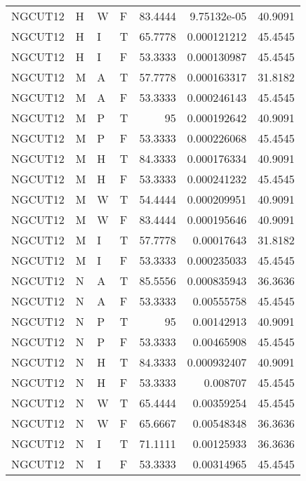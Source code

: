 \begin{table}[!htb]
{\begin{tabular}{llllrrr}
            NGCUT12  & H     & W     & F          & 83.4444    & 9.75132e-05 & 40.9091  \\
            NGCUT12  & H     & I     & T          & 65.7778    & 0.000121212 & 45.4545  \\
            NGCUT12  & H     & I     & F          & 53.3333    & 0.000130987 & 45.4545  \\
            NGCUT12  & M     & A     & T          & 57.7778    & 0.000163317 & 31.8182  \\
            NGCUT12  & M     & A     & F          & 53.3333    & 0.000246143 & 45.4545  \\
            NGCUT12  & M     & P     & T          & 95         & 0.000192642 & 40.9091  \\
            NGCUT12  & M     & P     & F          & 53.3333    & 0.000226068 & 45.4545  \\
            NGCUT12  & M     & H     & T          & 84.3333    & 0.000176334 & 40.9091  \\
            NGCUT12  & M     & H     & F          & 53.3333    & 0.000241232 & 45.4545  \\
            NGCUT12  & M     & W     & T          & 54.4444    & 0.000209951 & 40.9091  \\
            NGCUT12  & M     & W     & F          & 83.4444    & 0.000195646 & 40.9091  \\
            NGCUT12  & M     & I     & T          & 57.7778    & 0.00017643  & 31.8182  \\
            NGCUT12  & M     & I     & F          & 53.3333    & 0.000235033 & 45.4545  \\
            NGCUT12  & N     & A     & T          & 85.5556    & 0.000835943 & 36.3636  \\
            NGCUT12  & N     & A     & F          & 53.3333    & 0.00555758  & 45.4545  \\
            NGCUT12  & N     & P     & T          & 95         & 0.00142913  & 40.9091  \\
            NGCUT12  & N     & P     & F          & 53.3333    & 0.00465908  & 45.4545  \\
            NGCUT12  & N     & H     & T          & 84.3333    & 0.000932407 & 40.9091  \\
            NGCUT12  & N     & H     & F          & 53.3333    & 0.008707    & 45.4545  \\
            NGCUT12  & N     & W     & T          & 65.4444    & 0.00359254  & 45.4545  \\
            NGCUT12  & N     & W     & F          & 65.6667    & 0.00548348  & 36.3636  \\
            NGCUT12  & N     & I     & T          & 71.1111    & 0.00125933  & 36.3636  \\
            NGCUT12  & N     & I     & F          & 53.3333    & 0.00314965  & 45.4545  \\
            \hline
        \end{tabular}
    }{}
\end{table}